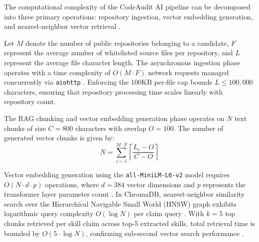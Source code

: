 The computational complexity of the CodeAudit AI pipeline can be decomposed into three primary operations: repository ingestion, vector embedding generation, and nearest-neighbor vector retrieval \cite{ref11, ref19, ref20}.

Let $M$ denote the number of public repositories belonging to a candidate, $F$ represent the average number of whitelisted source files per repository, and $L$ represent the average file character length. The asynchronous ingestion phase operates with a time complexity of $O(M \cdot F)$ network requests managed concurrently via \texttt{aiohttp} \cite{ref12}. Enforcing the 100KB per-file cap bounds $L \le 100,000$ characters, ensuring that repository processing time scales linearly with repository count.

The RAG chunking and vector embedding generation phase operates on $N$ text chunks of size $C = 800$ characters with overlap $O = 100$. The number of generated vector chunks is given by:
\begin{equation}
N = \sum_{i=1}^{M \cdot F} \left\lceil \frac{L_i - O}{C - O} \right\rceil
\end{equation}

Vector embedding generation using the \texttt{all-MiniLM-L6-v2} model requires $O(N \cdot d \cdot p)$ operations, where $d = 384$ vector dimensions and $p$ represents the transformer layer parameter count \cite{ref35, ref41}. In ChromaDB, nearest-neighbor similarity search over the Hierarchical Navigable Small World (HNSW) graph exhibits logarithmic query complexity $O(\log N)$ per claim query \cite{ref31}. With $k = 5$ top chunks retrieved per skill claim across top-5 extracted skills, total retrieval time is bounded by $O(5 \cdot \log N)$, confirming sub-second vector search performance \cite{ref11, ref34}.
